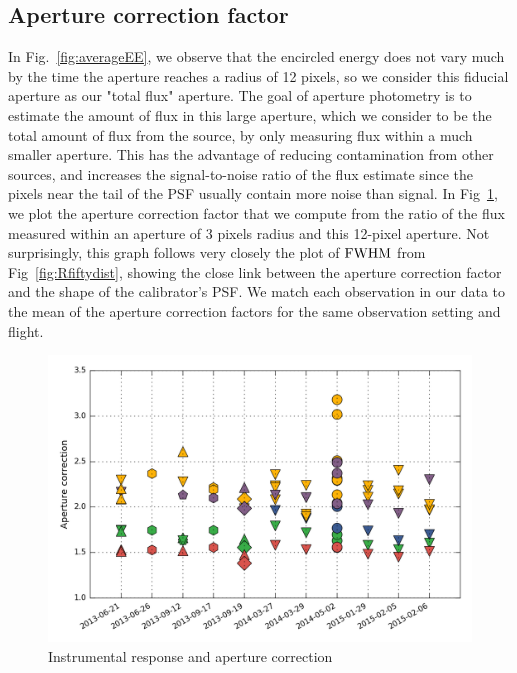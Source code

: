 \subsection{Aperture correction factor}
\label{subsec:apcorr}
In Fig.~\ref{fig:averageEE}, we observe that the encircled energy does not vary much by the time the aperture reaches a radius of 12 pixels, so we consider this fiducial aperture as our "total flux" aperture. The goal of aperture photometry is to estimate the amount of flux in this large aperture, which we consider to be the total amount of flux from the source, by only measuring flux within a much smaller aperture. This has the advantage of reducing contamination from other sources, and increases the signal-to-noise ratio of the flux estimate since the pixels near the tail of the PSF usually contain more noise than signal. 
In Fig~\ref{fig:apercorr}, we plot the aperture correction factor that we compute from the ratio of the flux measured within an aperture of 3 pixels radius and this 12-pixel aperture.  Not surprisingly, this graph follows very closely the plot of $\textrm{FWHM}$ from Fig~\ref{fig:Rfiftydist}, showing the close link between the aperture correction factor and the shape of the calibrator's PSF. We match each observation in our data to the mean of the aperture correction factors for the same observation setting and flight.

\begin{figure}[!h]
\begin{center}
\includegraphics[width=\textwidth]{Figures/Aper_corr.png}
\vspace{-0.5cm}
\caption[aperture correction]{Instrumental response and aperture correction}
\label{fig:apercorr}
\end{center}
\end{figure}




